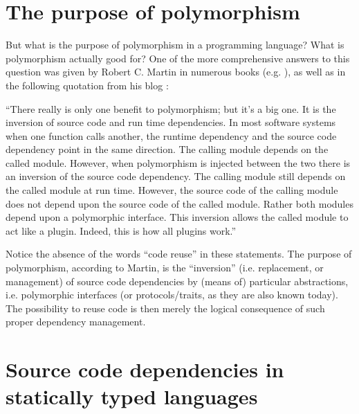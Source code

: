 \documentclass[11pt,oneside]{report}
\begin{document}
\section{The purpose of polymorphism}

But what is the purpose of polymorphism in a programming language?
What is polymorphism actually good for? One of the more comprehensive
answers to this question was given by Robert C. Martin in numerous
books (e.g. \cite{Martin_17}), as well as in the following quotation
from his blog \cite{Martin_14}:

\begin{displayquote}
``There really is only one benefit to polymorphism; but it's a big
  one. It is the inversion of source code and run time
  dependencies. In most software systems when one function calls
  another, the runtime dependency and the source code dependency point
  in the same direction. The calling module depends on the called
  module. However, when polymorphism is injected between the two there
  is an inversion of the source code dependency. The calling module
  still depends on the called module at run time. However, the source
  code of the calling module does not depend upon the source code of
  the called module. Rather both modules depend upon a polymorphic
  interface. This inversion allows the called module to act like a
  plugin. Indeed, this is how all plugins work.''
\end{displayquote}

Notice the absence of the words ``code reuse'' in these statements.
The purpose of polymorphism, according to Martin, is the ``inversion''
(i.e. replacement, or management) of source code dependencies by
(means of) particular abstractions, i.e. polymorphic interfaces (or
protocols/traits, as they are also known today). The possibility to
reuse code is then merely the logical consequence of such proper
dependency management.

\section{Source code dependencies in statically typed languages}
\end{document}
